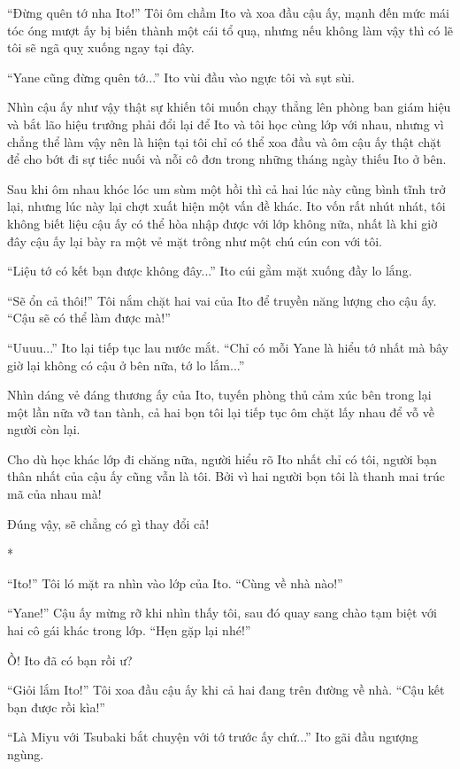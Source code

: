 {``Đừng quên tớ nha Ito!'' Tôi ôm chầm Ito và xoa đầu cậu ấy, mạnh đến
mức mái tóc óng mượt ấy bị biến thành một cái tổ quạ, nhưng nếu không
làm vậy thì có lẽ tôi sẽ ngã quỵ xuống ngay tại đây.

``Yane cũng đừng quên tớ...'' Ito vùi đầu vào ngực tôi và sụt sùi.

Nhìn cậu ấy như vậy thật sự khiến tôi muốn chạy thẳng lên phòng ban giám
hiệu và bắt lão hiệu trưởng phải đổi lại để Ito và tôi học cùng lớp với
nhau, nhưng vì chẳng thể làm vậy nên là hiện tại tôi chỉ có thể xoa đầu
và ôm cậu ấy thật chặt để cho bớt đi sự tiếc nuối và nỗi cô đơn trong
những tháng ngày thiếu Ito ở bên.

Sau khi ôm nhau khóc lóc um sùm một hồi thì cả hai lúc này cũng bình
tĩnh trở lại, nhưng lúc này lại chợt xuất hiện một vấn đề khác. Ito vốn
rất nhút nhát, tôi không biết liệu cậu ấy có thể hòa nhập được với lớp
không nữa, nhất là khi giờ đây cậu ấy lại bày ra một vẻ mặt trông như
một chú cún con với tôi.

``Liệu tớ có kết bạn được không đây...'' Ito cúi gằm mặt xuống đầy lo
lắng.

``Sẽ ổn cả thôi!'' Tôi nắm chặt hai vai của Ito để truyền năng lượng cho
cậu ấy. ``Cậu sẽ có thể làm được mà!''

``Uuuu...'' Ito lại tiếp tục lau nước mắt. ``Chỉ có mỗi Yane là hiểu tớ
nhất mà bây giờ lại không có cậu ở bên nữa, tớ lo lắm...''

Nhìn dáng vẻ đáng thương ấy của Ito, tuyến phòng thủ cảm xúc bên trong
lại một lần nữa vỡ tan tành, cả hai bọn tôi lại tiếp tục ôm chặt lấy
nhau để vỗ về người còn lại.

Cho dù học khác lớp đi chăng nữa, người hiểu rõ Ito nhất chỉ có tôi,
người bạn thân nhất của cậu ấy cũng vẫn là tôi. Bởi vì hai người bọn tôi
là thanh mai trúc mã của nhau mà!

Đúng vậy, sẽ chẳng có gì thay đổi cả!

*

``Ito!'' Tôi ló mặt ra nhìn vào lớp của Ito. ``Cùng về nhà nào!''

``Yane!'' Cậu ấy mừng rỡ khi nhìn thấy tôi, sau đó quay sang chào tạm
biệt với hai cô gái khác trong lớp. ``Hẹn gặp lại nhé!''

Ồ! Ito đã có bạn rồi ư?

``Giỏi lắm Ito!'' Tôi xoa đầu cậu ấy khi cả hai đang trên đường về nhà.
``Cậu kết bạn được rồi kìa!''

``Là Miyu với Tsubaki bắt chuyện với tớ trước ấy chứ...'' Ito gãi đầu
ngượng ngùng.

}
